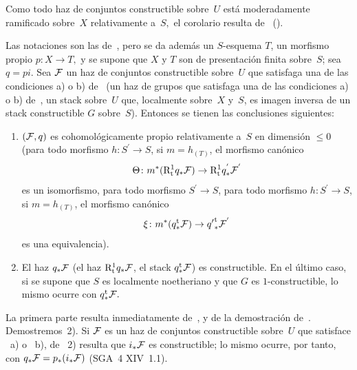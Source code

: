 Como todo haz de conjuntos constructible sobre~$U$ está
moderadamente ramificado sobre~$X$ relativamente a~$S,$ el
corolario resulta de~ (\resp {}).

\begin{corollaire}
\label{XIII.2.7}
Las notaciones son las de~, pero se da además
un $S$-esquema $T$, un morfismo propio $p\colon X\to T,$
y se supone que $X$ y $T$ son de presentación finita sobre~$S$; sea
$q=pi$. Sea $\cal{ F}$ un haz de conjuntos constructible sobre~$U$
que satisfaga una de las condiciones \textup{a)} o \textup{b)}
de~ (\resp un haz de grupos que satisfaga una de las
condiciones \textup{a)} o \textup{b)} de~,
\resp un stack sobre~$U$ que, localmente sobre~$X$ y~$S$, es imagen
inversa de un stack constructible $G$ sobre~$S$). Entonces
se tienen las conclusiones siguientes:
\begin{enumerate}
\item[1)] $(\cal{ F},q)$ es cohomológicamente propio relativamente
a~$S$ en dimensión $\leq 0$ (\resp para todo morfismo $h\colon
S^{'}\to S$, si $m=h_{(T)}$, el morfismo canónico
$$
\Theta\colon m^*(\R^1_{\tame}q_*\cal{ F})\to
\R^1_{\tame}q_*^{'}\cal{ F}^{'}
$$
es un isomorfismo, \resp
{}
{para todo morfismo $S^{'}\to S$,}
{para todo morfismo $h\colon S^{'}\to S$, si $m=h_{(T)}$,}
el morfismo canónico
$$
\xi \colon m^*(q_*^{\tame}\cal{ F})\to
{q'}_*^{{\tame}}\cal{F}^{'}
$$
es una equivalencia).
\item[2)] El haz $q_*\cal{ F}$ (\resp el haz
$\R_{\tame}^1q_*\cal{ F}$, \resp el stack $q_*^{\tame}\cal{ F}$)
es constructible. En el último caso, si se supone que $S$ es localmente
noetheriano y que $G$ es $1$-constructible, lo mismo ocurre con
$q_*^{\tame}\cal{ F}.$
\end{enumerate}
\end{corollaire}

La
primera parte resulta inmediatamente de~,
 y de la demostración
de~. Demostremos~2). Si $\cal{ F}$ es un haz
de conjuntos constructible sobre~$U$ que satisface ~a)
o ~b), de ~2) resulta que
$i_*\cal{ F}$ es constructible; lo mismo ocurre, por tanto, con
$q_*\cal{ F}=p_*(i_*\cal{ F})$ (SGA~4 XIV~1.1).

